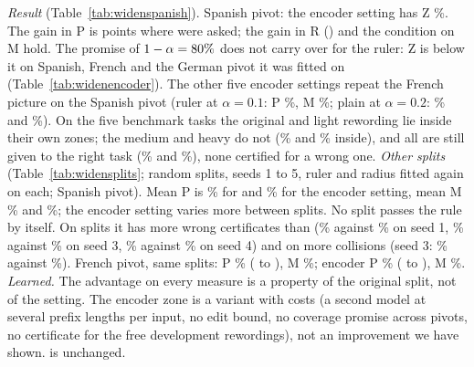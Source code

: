 \emph{Result} (Table~\ref{tab:widenspanish}). Spanish pivot: the encoder setting has \textsf{Z} \WidenSpEncEsZ{}\%. The gain in \textsf{P} is \WidenSpGainP{} points where \WidenSpAskP{} were asked; the gain in \textsf{R} (\WidenSpGainR{}) and the condition on \textsf{M} hold. The promise of $1 - \alpha = 80{}\%$ does not carry over for the ruler: \textsf{Z} is below it on Spanish, French and the German pivot it was fitted on (Table~\ref{tab:widenencoder}). The other five encoder settings repeat the French picture on the Spanish pivot (ruler at $\alpha = 0.1$: \textsf{P} \WidenSpAllRulerTenP{}\%, \textsf{M} \WidenSpAllRulerTenM{}\%; plain at $\alpha = 0.2$: \WidenSpAllPlainTwentyP{}\% and \WidenSpAllPlainTwentyM{}\%). On the five benchmark tasks the original and light rewording lie inside their own zones; the medium and heavy do not (\WidenSpBenchMediumZone{}\% and \WidenSpBenchHeavyZone{}\% inside), and all are still given to the right task (\WidenSpBenchMediumRouted{}\% and \WidenSpBenchHeavyRouted{}\%), none certified for a wrong one.
\emph{Other splits} (Table~\ref{tab:widensplits}; \WidenSplitCount{} random splits, seeds 1 to 5, ruler and radius fitted again on each; Spanish pivot). Mean \textsf{P} is \WidenSplitRulePMean{}\% for \cert{} and \WidenSplitEncPMean{}\% for the encoder setting, mean \textsf{M} \WidenSplitRuleMMean{}\% and \WidenSplitEncMMean{}\%; the encoder setting varies more between splits. No split passes the rule by itself. On \WidenSplitMoreM{} splits it has more wrong certificates than \cert{} (\WidenSplitSeedOneEncM{}\% against \WidenSplitSeedOneRuleM{}\% on seed 1, \WidenSplitSeedThreeEncM{}\% against \WidenSplitSeedThreeRuleM{}\% on seed 3, \WidenSplitSeedFourEncM{}\% against \WidenSplitSeedFourRuleM{}\% on seed 4) and on \WidenSplitMoreC{} more collisions (seed 3: \WidenSplitSeedThreeEncC{}\% against \WidenSplitSeedThreeRuleC{}\%). French pivot, same splits: \cert{} \textsf{P} \WidenSplitFrRulePMean{}\% (\WidenSplitFrRulePLow{} to \WidenSplitFrRulePHigh{}), \textsf{M} \WidenSplitFrRuleMMean{}\%; encoder \textsf{P} \WidenSplitFrEncPMean{}\% (\WidenSplitFrEncPLow{} to \WidenSplitFrEncPHigh{}), \textsf{M} \WidenSplitFrEncMMean{}\%.
\emph{Learned.} The advantage on every measure is a property of the original split, not of the setting. The encoder zone is a variant with costs (a second model at several prefix lengths per input, no edit bound, no coverage promise across pivots, no certificate for the free development rewordings), not an improvement we have shown. \cert{} is unchanged.

